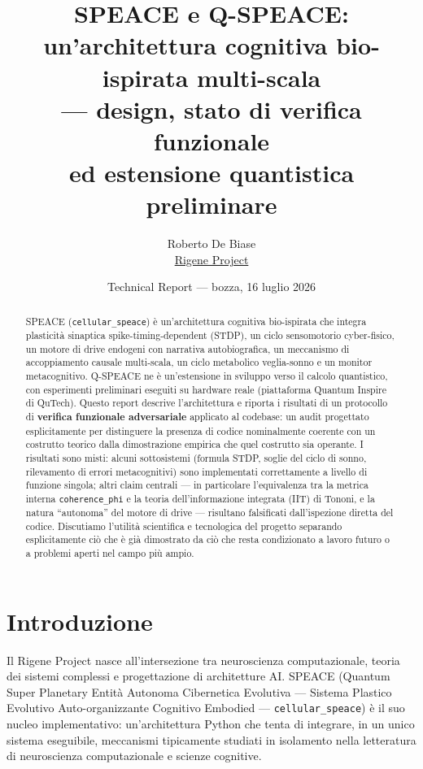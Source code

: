 \documentclass[11pt,a4paper]{article}
\title{\textbf{SPEACE e Q-SPEACE}:\\ un'architettura cognitiva bio-ispirata multi-scala\\
--- design, stato di verifica funzionale\\ ed estensione quantistica preliminare}
\author{Roberto De Biase\\\href{https://rigeneproject.org}{Rigene Project}}
\date{Technical Report --- bozza, 16 luglio 2026}
\newcommand{\code}[1]{\texttt{#1}}
\newcommand{\coherencephi}{\code{coherence\_phi}}
\begin{document}
\maketitle
\thispagestyle{empty}

\begin{abstract}
\noindent
\sloppy
SPEACE (\code{cellular\_speace}) \`e un'architettura cognitiva bio-ispirata che integra plasticit\`a sinaptica spike-timing-dependent (STDP), un ciclo sensomotorio cyber-fisico, un motore di drive endogeni con narrativa autobiografica, un meccanismo di accoppiamento causale multi-scala, un ciclo metabolico veglia-sonno e un monitor metacognitivo. Q-SPEACE ne \`e un'estensione in sviluppo verso il calcolo quantistico, con esperimenti preliminari eseguiti su hardware reale (piattaforma Quantum Inspire di QuTech). Questo report descrive l'architettura e riporta i risultati di un protocollo di \textbf{verifica funzionale adversariale} applicato al codebase: un audit progettato esplicitamente per distinguere la presenza di codice nominalmente coerente con un costrutto teorico dalla dimostrazione empirica che quel costrutto sia operante. I risultati sono misti: alcuni sottosistemi (formula STDP, soglie del ciclo di sonno, rilevamento di errori metacognitivi) sono implementati correttamente a livello di funzione singola; altri claim centrali --- in particolare l'equivalenza tra la metrica interna \coherencephi{} e la teoria dell'informazione integrata (IIT) di Tononi, e la natura ``autonoma'' del motore di drive --- risultano falsificati dall'ispezione diretta del codice. Discutiamo l'utilit\`a scientifica e tecnologica del progetto separando esplicitamente ci\`o che \`e gi\`a dimostrato da ci\`o che resta condizionato a lavoro futuro o a problemi aperti nel campo pi\`u ampio.
\end{abstract}

\newpage
\tableofcontents
\newpage

\section{Introduzione}
\label{sec:intro}

Il Rigene Project nasce all'intersezione tra neuroscienza computazionale, teoria dei sistemi complessi e progettazione di architetture AI. SPEACE (Quantum Super Planetary Entit\`a Autonoma Cibernetica Evolutiva --- Sistema Plastico Evolutivo Auto-organizzante Cognitivo Embodied --- \code{cellular\_speace}) \`e il suo nucleo implementativo: un'architettura Python che tenta di integrare, in un unico sistema eseguibile, meccanismi tipicamente studiati in isolamento nella letteratura di neuroscienza computazionale e scienze cognitive.
\end{document}
